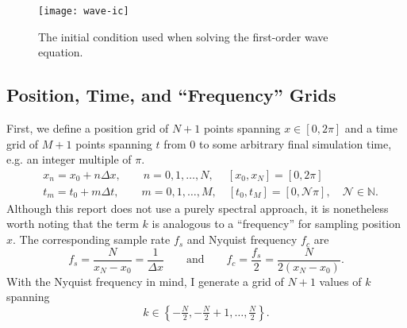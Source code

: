 \documentclass[11pt, a4paper]{article}
\newcommand{\eqtext}[1]{\qquad \text{#1} \qquad}
\begin{document}
\begin{figure}
\centering
\texttt{[image: wave-ic]}
\caption{The initial condition used when solving the first-order wave equation.}
\label{gal:fig:wave-ic}
\end{figure}

\subsection{Position, Time, and ``Frequency'' Grids}
First, we define a position grid of $ N+1 $ points spanning $ x \in [0, 2\pi] $ and a time grid of $ M+1 $ points spanning $ t $ from 0 to some arbitrary final simulation time, e.g. an integer multiple of $ \pi $.
\begin{align*}
	&x_{n} = x_{0} + n \Delta x, \qquad n = 0, 1, \ldots, N, \quad \ [x_{0}, x_{N}] = [0, 2\pi]\\
	&t_{m} = t_{0} + m \Delta t, \qquad m = 0, 1, \ldots, M, \quad [t_{0}, t_{M}] = [0, \mathcal{N}\pi], \quad  \mathcal{N} \in \mathbb{N}.
\end{align*}
Although this report does not use a purely spectral approach, it is nonetheless worth noting that the term $ k $ is analogous to a ``frequency'' for sampling position $ x $. The corresponding sample rate $ f_{s} $ and Nyquist frequency $ f_{c} $ are
\begin{equation*}
	f_{s} = \frac{N}{x_{N} - x_{0}} = \frac{1}{\Delta x} \eqtext{and} f_{c} = \frac{f_{s}}{2} = \frac{N}{2(x_{N} - x_{0})}.
\end{equation*}
With the Nyquist frequency in mind, I generate a grid of $ N+1 $ values of $ k $ spanning
\begin{equation*}
	k \in \left\{ -\tfrac{N}{2}, -\tfrac{N}{2} + 1, \ldots,  \tfrac{N}{2}\right\}.
\end{equation*}
\end{document}
